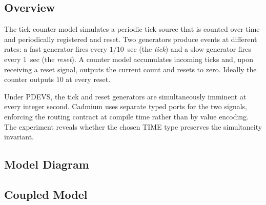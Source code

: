 \subsection*{Overview}

The tick-counter model simulates a periodic tick source that is counted
over time and periodically registered and reset.  Two generators
produce events at different rates: a fast generator fires every
$1/10$~sec (the \emph{tick}) and a slow generator fires every $1$~sec
(the \emph{reset}).  A counter model accumulates incoming ticks and,
upon receiving a reset signal, outputs the current count and resets to
zero.  Ideally the counter outputs $10$ at every reset.

Under PDEVS, the tick and reset generators are simultaneously imminent at
every integer second.  Cadmium uses separate typed ports for the two
signals, enforcing the routing contract at compile time rather than by
value encoding.  The experiment reveals whether the chosen TIME type
preserves the simultaneity invariant.

\subsection*{Model Diagram}

\begin{center}
\end{center}

\subsection*{Coupled Model}

